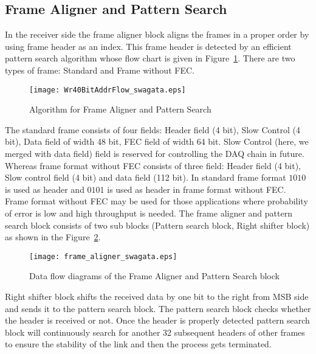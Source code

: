 \documentclass[10pt, conference, compsocconf]{IEEEtran}
\begin{document}
\subsection{Frame Aligner and Pattern Search} \label{FrameAligner}
In the receiver side the frame aligner block aligns the frames in a proper order by using frame header as an index. This frame header is detected by an efficient pattern search algorithm whose flow chart is given in Figure~\ref{fig:FrameAlignerFlow}. There are two types of frame: Standard and Frame without FEC.\begin{figure}[t!]
\centering
\texttt{[image: Wr40BitAddrFlow\_swagata.eps]}
\vspace*{-10pt}
\caption{Algorithm for Frame Aligner and Pattern Search}
\vspace*{-5pt}
\label{fig:FrameAlignerFlow}
\end{figure}
The standard frame consists of four fields: Header field (4 bit), Slow Control (4 bit), Data field of width 48 bit, FEC field of width 64 bit. 
Slow Control (here, we merged with data field) field is reserved for controlling the DAQ chain in future.
Whereas frame format without FEC consists of three field: Header field (4 bit), Slow control field (4 bit) and data field (112 bit). In standard frame format $1010$ is used as header and $0101$ is used as header in frame format without FEC. Frame format without FEC may be used for those applications where probability of error is low and high throughput is needed. The frame aligner and pattern search block consists of two sub blocks (Pattern search block, Right shifter block) as shown in the Figure~\ref{fig:FrameAlignerWork}.
\begin{figure}[t!]
\centering
\texttt{[image: frame\_aligner\_swagata.eps]}
\vspace{-5 pt}
\caption{Data flow diagrams of the Frame Aligner and Pattern Search block}
\vspace{-10 pt}
\label{fig:FrameAlignerWork}
\end{figure}
  Right shifter block shifts the received data by one bit to the right from MSB side and sends it to the pattern search block. The pattern search block checks whether the header is received or not. Once the header is properly detected pattern search block will continuously search for another 32 subsequent headers of other frames to ensure the stability of the link and then the process gets terminated.
\end{document}
